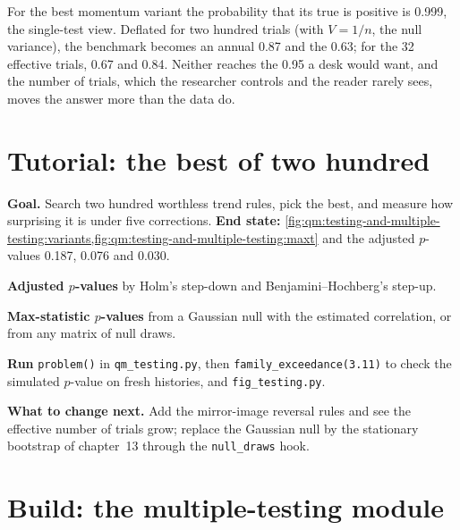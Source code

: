 For the best momentum variant the probability that its true  is positive is 0.999, the single-test view. Deflated for
two hundred trials (with $V = 1/n$, the null variance), the benchmark becomes an annual 0.87 and the  0.63;
for the 32 effective trials, 0.67 and 0.84. Neither reaches the 0.95 a desk would want, and the number of trials, which the
researcher controls and the reader rarely sees, moves the answer more than the data do.

\section{Tutorial: the best of two hundred}\label{tut:qm:testing-and-multiple-testing:best}

\begin{tutorial}
\textbf{Goal.} Search two hundred worthless trend rules, pick the best, and measure how surprising it is under five corrections.
\textbf{End state:} \cref{fig:qm:testing-and-multiple-testing:variants,fig:qm:testing-and-multiple-testing:maxt} and the adjusted $p$-values 0.187, 0.076 and 0.030.
\begin{tutsteps}
\item \textbf{Adjusted $p$-values} by Holm's step-down and Benjamini--Hochberg's step-up.
\label{lst:qm:testing-and-multiple-testing:holm}
\item \textbf{Max-statistic $p$-values} from a Gaussian null with the estimated correlation, or from any matrix of null draws.
\label{lst:qm:testing-and-multiple-testing:maxt}
\item \textbf{Run} \texttt{problem()} in \texttt{qm\_testing.py}, then \texttt{family\_exceedance(3.11)} to check the simulated $p$-value on
fresh histories, and \texttt{fig\_testing.py}.
\end{tutsteps}
\textbf{What to change next.} Add the mirror-image reversal rules and see the effective number of trials grow; replace the Gaussian
null by the stationary bootstrap of chapter~13 through the \texttt{null\_draws} hook.
\end{tutorial}

\section{Build: the multiple-testing module}\label{bld:qm:testing-and-multiple-testing:multitest}

